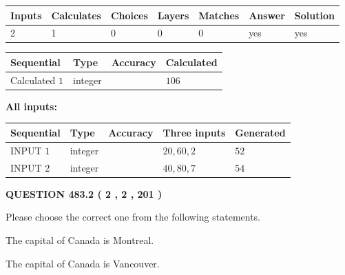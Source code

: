 \documentclass[12pt]{article}
\begin{document}
   
   
   
\noindent\begin{tabular}{|l|l|l|l|l|l|l|}
 \hline
Inputs & Calculates & Choices & Layers & Matches & Answer & Solution \\ \hline
 2  & 
 1  & 
 0
  & 
 0  & 
 0  & 
  yes & 
  yes 
  \\ \hline
 \end{tabular}
   
   
   
   
\noindent{}
   
   
  
  
\noindent\begin{tabular}{|l|l|l|l|}
\hline
 Sequential & Type & Accuracy & Calculated \\ 
\hline
 
 
  Calculated $  1 $ & integer &  & 
  $ 106 $ 
 \\  \hline  
 \end{tabular}
   
   
   
   
\noindent\vspace{0.1in}\hspace{-0.08in} {\textbf{\Large{All inputs: }}}
   
   
  
  
\noindent\begin{tabular}{|l|l|l|l|l|}
\hline
 Sequential & Type & Accuracy & Three inputs & Generated \\ 
\hline
 
 
  INPUT $  1 $ & integer &  & $
 20
 , 
 60
 , 
 2
 $ & $ 52 $ 
 \\  \hline  
 
 
  INPUT $  2 $ & integer &  & $
 40
 , 
 80
 , 
 7
 $ & $ 54 $ 
 \\  \hline  
 \end{tabular}
   
   
  
\vspace{0.2in}
  
{\textbf{\Large{QUESTION
483.2 
 ( 2 , 2 , 201 )
}}}
  
  
Please choose the correct one from the following statements.
 
 
The capital of Canada is Montreal.
 
 
The capital of Canada is Vancouver.
 
\end{document}
